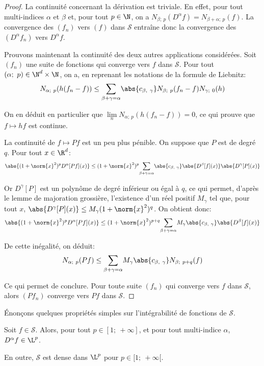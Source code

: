 \begin{proof}
\medskip
La continuité concernant la dérivation est triviale. En effet, pour tout multi-indices $\alpha$ et $\beta$ et, pour tout $p \in \N$, on a $N_{\beta;~p} \left (D^{\alpha} f\right ) = N_{\beta+\alpha;~p} (f)$. La convergence des $(f_n)$ vers $(f)$ dans $\mathcal{S}$ entraîne donc la convergence des $\left (D^{\alpha} f_n\right )$ vers $D^{\alpha} f$.

\medskip
Prouvons maintenant la continuité des deux autres applications considérées. Soit $(f_n)$ une suite de fonctions qui converge vers $f$ dans $\mathcal{S}$. Pour tout $(\alpha;~p) \in \N^d \times \N$, on a, en reprenant les notations de la formule de Liebnitz:
\[
N_{\alpha;~p}(h(f_n-f)) \leq \displaystyle{\sum \limits_{\beta + \gamma = \alpha}} \abs{c_{\beta,~\gamma}} N_{\beta;~p} (f_n-f) N_{\gamma;~0} (h)
\]

On en déduit en particulier que $\lim \limits_{n} N_{\alpha;~p}(h(f_n-f)) = 0$, ce qui prouve que $f \mapsto hf$ est continue.

\medskip
La continuité de $f \mapsto Pf$ est un peu plus pénible. On suppose que $P$ est de degré $q$. Pour tout $x \in \R^d$:
\[
\abs{(1+\norm{x}^2)^p D^{\alpha} [Pf] (x)} \leq (1+\norm{x}^2)^p \displaystyle{\sum \limits_{\beta + \gamma = \alpha}} \abs{c_{\beta,~\gamma}} \abs{D^{\beta} [f] (x)} \abs{D^{\gamma} [P] (x)}
\]

Or $D^{\gamma}[P]$ est un polynôme de degré inférieur ou égal à $q$, ce qui permet, d'après le lemme de majoration grossière, l'existence d'un réel positif $M_{\gamma}$ tel que, pour tout $x$, $\abs{D^{\gamma}[P](x)} \leq M_{\gamma} (1+\norm{x}^2)^q$. On obtient donc:
\[
\abs{(1+\norm{x}^2)^p D^{\alpha} [Pf] (x)} \leq (1+\norm{x}^2)^{p+q} \displaystyle{\sum \limits_{\beta + \gamma = \alpha}} M_{\gamma} \abs{c_{\beta,~\gamma}} \abs{D^{\beta} [f] (x)} 
\]

De cette inégalité, on déduit:
\[
N_{\alpha;~p} (Pf) \leq \displaystyle{\sum \limits_{\beta + \gamma = \alpha}} M_{\gamma} \abs{c_{\beta,~\gamma}} N_{\beta;~p+q} (f)
\]

Ce qui permet de conclure. Pour toute suite $(f_n)$ qui converge vers $f$ dans $\mathcal{S}$, alors $(Pf_n)$ converge vers $Pf$ dans $\mathcal{S}$.
\end{proof}

Énonçons quelques propriétés simples sur l'intégrabilité de fonctions de $\mathcal{S}$.

\begin{prop}
Soit $f \in \mathcal{S}$. Alors, pour tout $p \in [1;~+\infty]$, et pour tout multi-indice $\alpha$, $D^{\alpha} f \in \L^p$.

\medskip
En outre, $\mathcal{S}$ est dense dans $\L^p$ pour $p \in [1;~+\infty[$.
\end{prop}

